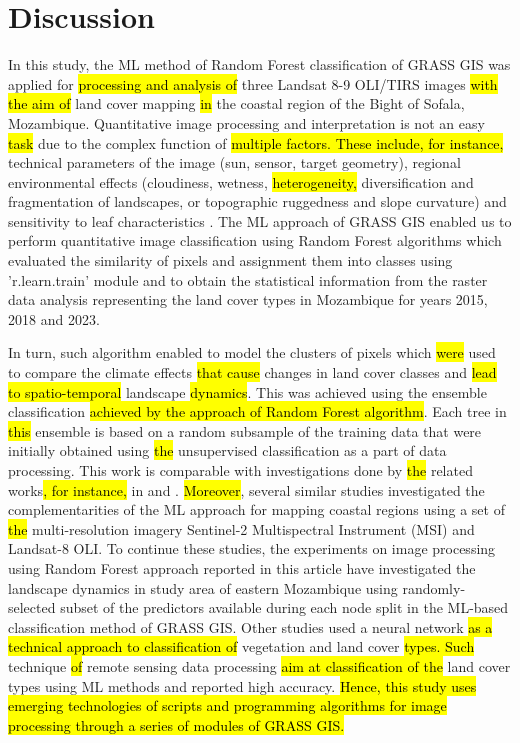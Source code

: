 \documentclass[coasts,article,submit,pdftex,moreauthors]{Definitions/mdpi}
\begin{document}
\section{Discussion}

In this study, the ML method of Random Forest classification of GRASS GIS was applied for \hl{processing and analysis of }three Landsat 8-9 OLI/TIRS images \hl{with the aim of }land cover mapping \hl{in} the coastal region of the Bight of Sofala, Mozambique. Quantitative image processing and interpretation is not an easy \hl{task} due to the complex function of \hl{multiple factors. These include, for instance, }technical parameters of the image (sun, sensor, target geometry), regional environmental effects (cloudiness, wetness, \hl{heterogeneity, }diversification and fragmentation of landscapes, or topographic ruggedness and slope curvature) and sensitivity to leaf characteristics \cite{Mitchard}. The ML approach of GRASS GIS enabled us to perform quantitative image classification using Random Forest algorithms which evaluated the similarity of pixels and assignment them into classes using 'r.learn.train' module and to obtain the statistical information from the raster data analysis representing the land cover types in Mozambique for\hl{ }years 2015, 2018 and 2023. 

In turn, such algorithm enabled to model the clusters of pixels which \hl{were} used to compare the climate effects \hl{that cause} changes in land cover classes and \hl{lead to spatio-temporal }landscape \hl{dynamics}. This was achieved using the ensemble classification \hl{achieved by the approach of Random Forest algorithm}. Each tree in \hl{this} ensemble is based on a random subsample of the training data that were initially obtained using \hl{the }unsupervised classification as a part of data processing. This work is comparable with investigations done by \hl{the }related works\hl{, for instance,} in \cite{FERNANDO2023} and \cite{KOLARIK2024111445}. \hl{Moreover}, several similar studies \cite{BERA20234691,land12122149,ZHANG2023108250} investigated the complementarities of the ML approach for mapping coastal regions using a set of \hl{the }multi-resolution imagery Sentinel-2 Multispectral Instrument (MSI) and Landsat-8 OLI. To continue these studies, the experiments on image processing using Random Forest approach reported in this article have investigated the landscape dynamics in study area of eastern Mozambique using randomly-selected subset of the predictors available during each node split in the ML-based classification method of GRASS GIS. Other studies \cite{MOUNTRAKIS2023106,SINGH2021100645,ZHENG2023100974} used a neural network \hl{as a technical approach to classification of} vegetation and land cover \hl{types. Such }technique \hl{of} remote sensing data processing \hl{aim at classification of the }land cover types using ML methods and reported high accuracy. \hl{Hence, this study uses emerging technologies of scripts and programming algorithms for image processing through a series of modules of GRASS GIS.}
\end{document}
